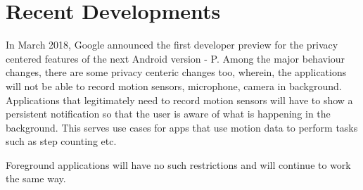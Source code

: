 
\newpage
\section{Recent Developments}


In March 2018, Google announced the first developer preview for the privacy centered features of the next Android version - P. Among the major behaviour changes, there are some privacy centeric changes too, wherein, the applications will not be able to record motion sensors, microphone, camera in background. Applications that legitimately need to record motion sensors will have to show a persistent notification so that the user is aware of what is happening in the background. This serves use cases for apps that use motion data to perform tasks such as step counting etc.

Foreground applications will have no such restrictions and will continue to work the same way.


